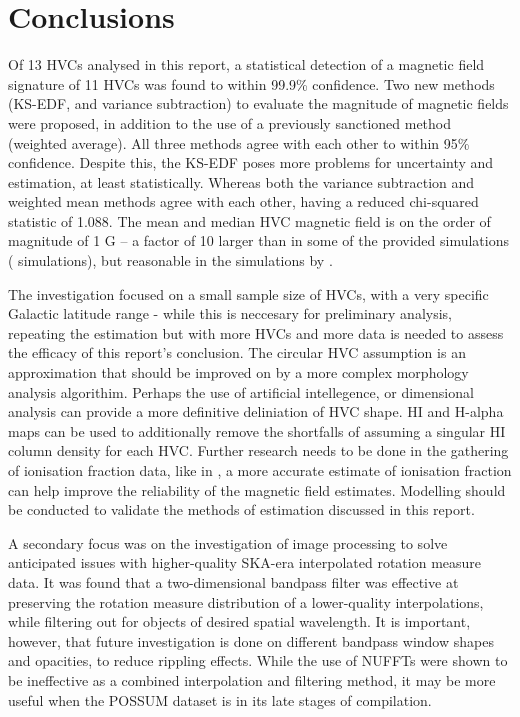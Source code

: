 \chapter{Conclusions}
\label{cha:conclusion}

Of 13 HVCs analysed in this report, a statistical detection of a magnetic field signature of 11 HVCs was found to within 99.9\% confidence. Two new methods (KS-EDF, and variance subtraction) to evaluate the magnitude of magnetic fields were proposed, in addition to the use of a previously sanctioned method (weighted average). All three methods agree with each other to within 95\% confidence. Despite this, the KS-EDF poses more problems for uncertainty and estimation, at least statistically. Whereas both the variance subtraction and weighted mean methods agree with each other, having a reduced chi-squared statistic of 1.088. The mean and median HVC magnetic field is on the order of magnitude of 1 \textmu G – a factor of 10 larger than in some of the provided simulations (\citeauthor{ID23} simulations), but reasonable in the simulations by \cite{ID34}.


The investigation focused on a small sample size of HVCs, with a very specific Galactic latitude range - while this is neccesary for preliminary analysis, repeating the estimation but with more HVCs and more data is needed to assess the efficacy of this report's conclusion. The circular HVC assumption is an approximation that should be improved on by a more complex morphology analysis algorithim. Perhaps the use of artificial intellegence, or dimensional analysis can provide a more definitive deliniation of HVC shape. HI and H-alpha maps can be used to additionally remove the shortfalls of assuming a singular HI column density for each HVC. Further research needs to be done in the gathering of ionisation fraction data, like in \cite{ID67}, a more accurate estimate of ionisation fraction can help improve the reliability of the magnetic field estimates. Modelling should be conducted to validate the methods of estimation discussed in this report.


A secondary focus was on the investigation of image processing to solve anticipated issues with higher-quality SKA-era interpolated rotation measure data. It was found that a two-dimensional bandpass filter was effective at preserving the rotation measure distribution of a lower-quality interpolations, while filtering out for objects of desired spatial wavelength. It is important, however, that future investigation is done on different bandpass window shapes and opacities, to reduce rippling effects. While the use of NUFFTs were shown to be ineffective as a combined interpolation and filtering method, it may be more useful when the POSSUM dataset is in its late stages of compilation.
